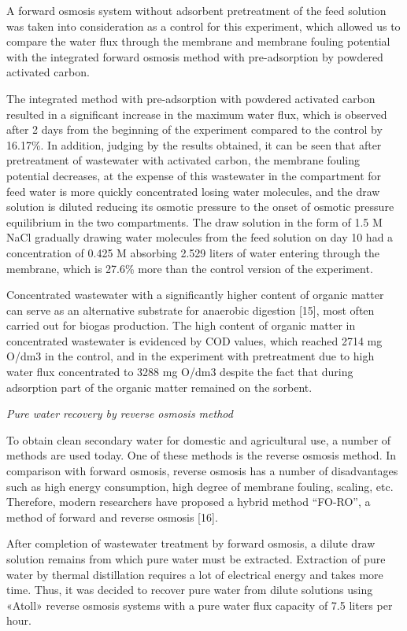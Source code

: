 \begin{multicols}{2}
A forward osmosis system without adsorbent pretreatment of the feed
solution was taken into consideration as a control for this experiment,
which allowed us to compare the water flux through the membrane and
membrane fouling potential with the integrated forward osmosis method
with pre-adsorption by powdered activated carbon.

The integrated method with pre-adsorption with powdered activated carbon
resulted in a significant increase in the maximum water flux, which is
observed after 2 days from the beginning of the experiment compared to
the control by 16.17\%. In addition, judging by the results obtained, it
can be seen that after pretreatment of wastewater with activated carbon,
the membrane fouling potential decreases, at the expense of this
wastewater in the compartment for feed water is more quickly
concentrated losing water molecules, and the draw solution is diluted
reducing its osmotic pressure to the onset of osmotic pressure
equilibrium in the two compartments. The draw solution in the form of
1.5 M NaCl gradually drawing water molecules from the feed solution on
day 10 had a concentration of 0.425 M absorbing 2.529 liters of water
entering through the membrane, which is 27.6\% more than the control
version of the experiment.

Concentrated wastewater with a significantly higher content of organic
matter can serve as an alternative substrate for anaerobic digestion
{[}15{]}, most often carried out for biogas production. The high content
of organic matter in concentrated wastewater is evidenced by COD values,
which reached 2714 mg O/dm3 in the control, and in the experiment with
pretreatment due to high water flux concentrated to 3288 mg O/dm3
despite the fact that during adsorption part of the organic matter
remained on the sorbent.

\emph{Pure water recovery by reverse osmosis method}

To obtain clean secondary water for domestic and agricultural use, a
number of methods are used today. One of these methods is the reverse
osmosis method. In comparison with forward osmosis, reverse osmosis has
a number of disadvantages such as high energy consumption, high degree
of membrane fouling, scaling, etc. Therefore, modern researchers have
proposed a hybrid method ``FO-RO'', a method of forward and reverse
osmosis {[}16{]}.

After completion of wastewater treatment by forward osmosis, a dilute
draw solution remains from which pure water must be extracted.
Extraction of pure water by thermal distillation requires a lot of
electrical energy and takes more time. Thus, it was decided to recover
pure water from dilute solutions using «Atoll» reverse osmosis systems
with a pure water flux capacity of 7.5 liters per hour.


\end{multicols}
